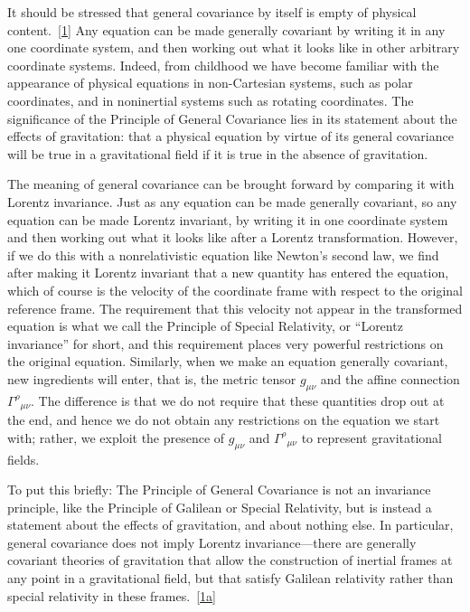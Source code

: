 It should be stressed that general covariance by itself is empty of physical
content.~\hyperref[ch4-ref-1]{[1]} Any equation can be made generally
covariant by writing it in any one coordinate system, and then working out
what it looks like in other arbitrary coordinate systems. Indeed, from
childhood we have become familiar with the appearance of physical equations
in non-Cartesian systems, such as polar coordinates, and in noninertial
systems such as rotating coordinates. The significance of the Principle of
General Covariance lies in its statement about the effects of gravitation:
that a physical equation by virtue of its general covariance will be true in
a gravitational field if it is true in the absence of gravitation.

The meaning of general covariance can be brought forward by comparing it with
Lorentz invariance. Just as any equation can be made generally covariant, so
any equation can be made Lorentz invariant, by writing it in one coordinate
system and then working out what it looks like after a Lorentz transformation.
However, if we do this with a nonrelativistic equation like Newton's second
law, we find after making it Lorentz invariant that a new quantity has entered
the equation, which of course is the velocity of the coordinate frame with
respect to the original reference frame. The requirement that this velocity
not appear in the transformed equation is what we call the Principle of
Special Relativity, or ``Lorentz invariance'' for short, and this requirement
places very powerful restrictions on the original equation. Similarly, when
we make an equation generally covariant, new ingredients will enter, that is,
the metric tensor \(g_{\mu\nu}\) and the affine connection
\(\Gamma^\rho{}_{\mu\nu}\). The difference is that we do not require that
these quantities drop out at the end, and hence we do not obtain any
restrictions on the equation we start with; rather, we exploit the presence of
\(g_{\mu\nu}\) and \(\Gamma^\rho{}_{\mu\nu}\) to represent gravitational
fields.

To put this briefly: The Principle of General Covariance is not an invariance
principle, like the Principle of Galilean or Special Relativity, but is instead
a statement about the effects of gravitation, and about nothing else. In
particular, general covariance does not imply Lorentz invariance---there are
generally covariant theories of gravitation that allow the construction of
inertial frames at any point in a gravitational field, but that satisfy
Galilean relativity rather than special relativity in these
frames.~\hyperref[ch4-ref-1a]{[1a]}

